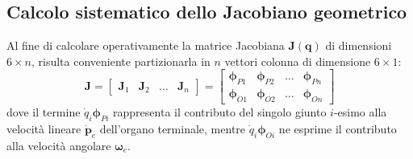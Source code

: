 \subsection{Calcolo sistematico dello Jacobiano geometrico}

Al fine di calcolare operativamente la matrice Jacobiana $\boldsymbol{J}(\boldsymbol{q})$ di dimensioni $6 \times n$, risulta conveniente partizionarla in $n$ vettori colonna di dimensione $6 \times 1$:
\[
    \boldsymbol{J} = 
    \begin{bmatrix} 
        \boldsymbol{J}_1 & \boldsymbol{J}_2 & \dots & \boldsymbol{J}_n 
    \end{bmatrix} 
    = 
    \begin{bmatrix} 
        \boldsymbol{\phi}_{P1} & \boldsymbol{\phi}_{P2} & \dots & \boldsymbol{\phi}_{Pn} \\ 
        \boldsymbol{\phi}_{O1} & \boldsymbol{\phi}_{O2} & \dots & \boldsymbol{\phi}_{On} 
    \end{bmatrix}
\]
dove il termine $\dot{q}_i \boldsymbol{\phi}_{Pi}$ rappresenta il contributo del singolo giunto $i$-esimo alla velocità lineare $\dot{\boldsymbol{p}}_e$ dell'organo terminale, mentre $\dot{q}_i \boldsymbol{\phi}_{Oi}$ ne esprime il contributo alla velocità angolare $\boldsymbol{\omega}_e$. 

